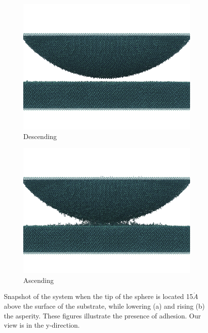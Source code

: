 \documentclass[twoside,english]{uiofysmaster}
\begin{document}
\begin{figure}
\centering

\begin{subfigure}[b]{0.7\textwidth}
\includegraphics[width=\textwidth]{figures/hysteresis/simulationBox/sim015}
\caption{Descending}
\label{fig:adhesionLowering}
\end{subfigure}

\begin{subfigure}[b]{0.7\textwidth}
\includegraphics[width=\textwidth]{figures/hysteresis/simulationBox/sim0115}
\caption{Ascending}
\label{fig:adhesionRising}
\end{subfigure}

\caption{Snapshot of the system when the tip of the sphere is located 15$\mathring{A}$ above the surface of the substrate, while lowering (a) and rising (b) the asperity. These figures illustrate the presence of adhesion. Our view is in the y-direction.}
\end{figure}
\end{document}
